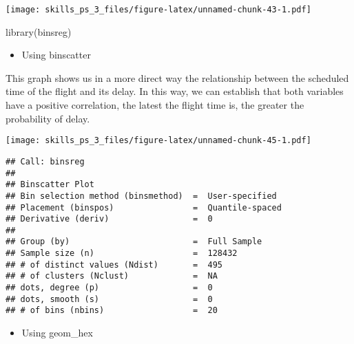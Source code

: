 \documentclass[
]{article}
\newenvironment{Shaded}{\begin{snugshade}}{\end{snugshade}}
\newcommand{\AttributeTok}[1]{\textcolor[rgb]{0.77,0.63,0.00}{#1}}
\newcommand{\CommentTok}[1]{\textcolor[rgb]{0.56,0.35,0.01}{\textit{#1}}}
\newcommand{\DecValTok}[1]{\textcolor[rgb]{0.00,0.00,0.81}{#1}}
\newcommand{\FunctionTok}[1]{\textcolor[rgb]{0.00,0.00,0.00}{#1}}
\newcommand{\NormalTok}[1]{#1}
\newcommand{\OtherTok}[1]{\textcolor[rgb]{0.56,0.35,0.01}{#1}}
\newcommand{\SpecialCharTok}[1]{\textcolor[rgb]{0.00,0.00,0.00}{#1}}
\providecommand{\tightlist}{%
  \setlength{\itemsep}{0pt}\setlength{\parskip}{0pt}}
\begin{document}
\texttt{[image: skills\_ps\_3\_files/figure-latex/unnamed-chunk-43-1.pdf]}

\begin{Shaded}
\begin{Highlighting}[]
\FunctionTok{library}\NormalTok{(binsreg)}
\end{Highlighting}
\end{Shaded}

\begin{itemize}
\tightlist
\item
  Using binscatter
\end{itemize}

This graph shows us in a more direct way the relationship between the
scheduled time of the flight and its delay. In this way, we can
establish that both variables have a positive correlation, the latest
the flight time is, the greater the probability of delay.

\begin{Shaded}
\end{Shaded}

\texttt{[image: skills\_ps\_3\_files/figure-latex/unnamed-chunk-45-1.pdf]}

\begin{verbatim}
## Call: binsreg
## 
## Binscatter Plot
## Bin selection method (binsmethod)  =  User-specified
## Placement (binspos)                =  Quantile-spaced
## Derivative (deriv)                 =  0
## 
## Group (by)                         =  Full Sample
## Sample size (n)                    =  128432
## # of distinct values (Ndist)       =  495
## # of clusters (Nclust)             =  NA
## dots, degree (p)                   =  0
## dots, smooth (s)                   =  0
## # of bins (nbins)                  =  20
\end{verbatim}

\begin{itemize}
\tightlist
\item
  Using geom\_hex
\end{itemize}
\end{document}
